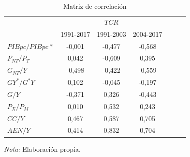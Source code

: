\documentclass[12pt,letterpaper]{article}
\begin{document}
\begin{table}
\caption{Matriz de correlación}
\begin{center}
\begin{tabular}{lcccccc}									
\hline													
\hline
							& 	\multicolumn{3}{c}{$TCR$}\\
							&	1991-2017	&	1991-2003	& 2004-2017	\\
\hline													
$PIBpc/PIBpc*$	&	-0,001		&	-0,477			&	-0,568			\\
$P_{NT}/P_T$		&	0,042		&	-0,609			&	0,395			\\
$G_{NT}/Y$			&	-0,498		&	-0,422			&	-0,559			\\
$GY^*/G^*Y$		&	0,102		&	-0,045			&	-0,197			\\
$G/Y$			 		&	-0,371		&	0,326			&	-0,443			\\
$P_X/P_M$			&	0,010		&	0,532			&	0,243			\\
$CC/Y$ 				&	0,467		&	0,587			&	0,705			\\
$AEN/Y$ 				&	0,414		&	0,832			&	0,704			\\
\hline													
\hline									
\end{tabular}	
\end{center}						
\begin{scriptsize}
\emph{Nota:} Elaboración propia.
\end{scriptsize}	
\label{correbeer}	
\end{table}	
\end{document}
